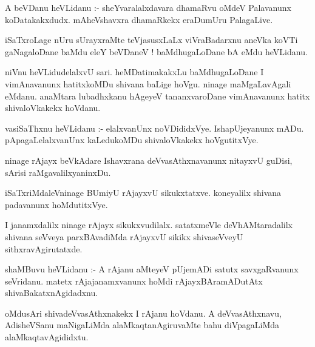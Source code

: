 \documentclass{article}
\begin{document}
\begin{mn}
A  beVDanu  heVLidanu :- sheYvaralalxdavara  dhamaRvu  oMdeV  Palavanunx  koDatakakxdudx.  mAheVshavxra  
dhamaRkekx  eraDumUru  PalagaLive.
\end{mn}

\begin{mn}
iSaTxroLage  nUru  sUrayxraMte  teVjasusxLaLx  viVraBadarxnu  aneVka  koVTi  gaNagaloDane  baMdu  eleY  
beVDaneV !  baMdhugaLoDane  bA  eMdu  heVLidanu.
\end{mn}

\begin{mn}
niVnu  heVLidudelalxvU  sari.  heMDatimakakxLu  baMdhugaLoDane  I  vimAnavanunx  hatitxkoMDu  shivana  
baLige  hoVgu.  ninage  maMgaLavAgali  eMdanu.  anaMtara  lubadhxkanu  hAgeyeV  tananxvaroDane  
vimAnavanunx  hatitx  shivaloVkakekx  hoVdanu.  
\end{mn}

\begin{mn}
vasiSaThxnu  heVLidanu :- elalxvanUnx  noVDididxVye.  IshapUjeyanunx  mADu.  pApagaLelalxvanUnx  
kaLedukoMDu  shivaloVkakekx  hoVgutitxVye.
\end{mn}

\begin{mn}
ninage  rAjayx  beVkAdare  Ishavxrana  deVvasAthxnavanunx  nitayxvU  guDisi,  sArisi  raMgavalilxyaninxDu.
\end{mn}

\begin{mn}
iSaTxriMdaleVninage  BUmiyU  rAjayxvU  sikukxtatxve.  koneyalilx  shivana  padavanunx  hoMdutitxVye.
\end{mn}

\begin{mn}
I  janamxdalilx  ninage  rAjayx  sikukxvudilalx.  satatxmeVle  deVhAMtaradalilx  shivana  seVveya  
parxBAvadiMda  rAjayxvU  sikikx  shivaseVveyU  sithxravAgirutatxde.  
\end{mn}

\begin{mn}
shaMBuvu  heVLidanu :- A  rAjanu  aMteyeV  pUjemADi  satutx  savxgaRvanunx  seVridanu.  matetx  
rAjajanamxvanunx  hoMdi  rAjayxBAramADutAtx  shivaBakatxnAgidadxnu.
\end{mn}

\begin{mn}
oMdusAri  shivadeVvasAthxnakekx  I  rAjanu  hoVdanu.  A  deVvasAthxnavu,  AdisheVSanu  maNigaLiMda  
alaMkaqtanAgiruvaMte  bahu  diVpagaLiMda  alaMkaqtavAgididxtu.
\end{mn}
\end{document}
